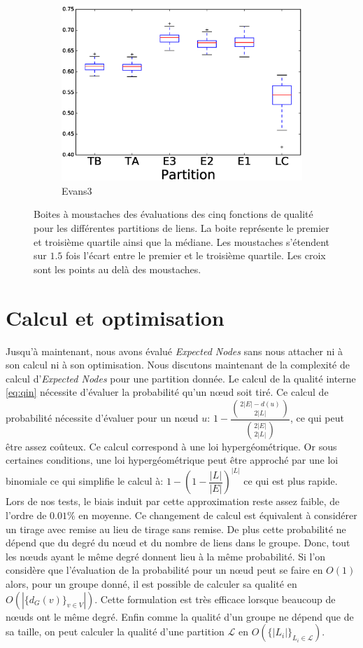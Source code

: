 \begin{figure}
\begin{subfigure}{0.31\textwidth}
		\includegraphics[width=\linewidth]{img/ExpectedNodes/LF/LFR1_Evans3_ALL.eps}
		\caption{\label{fig:LFE3}Evans3}		
	\end{subfigure}
	\caption{Boites à moustaches des évaluations des cinq fonctions de qualité pour les différentes partitions de liens. 
	La boite représente le premier et troisième quartile ainsi que la médiane.
	Les moustaches s'étendent sur $1.5$ fois l'écart entre le premier et le troisième quartile. 
	Les croix sont les points au delà des moustaches.
	}
	\label{fig:LF}
\end{figure}


\section{Calcul et optimisation}
Jusqu'à maintenant, nous avons évalué \emph{Expected Nodes} sans nous attacher ni à son calcul ni à son optimisation.
Nous discutons maintenant de la complexité de calcul d'\emph{Expected Nodes} pour une partition donnée.
Le calcul de la qualité interne \ref{eq:qin} nécessite d'évaluer la probabilité qu'un n\oe{}ud soit tiré.
Ce calcul de probabilité nécessite d'évaluer pour un n\oe{}ud $u$: $1 - \dfrac{ \binom{2|E|-d(u)}{2|L|} }{ \binom{2|E|}{2|L|} }$, ce qui peut être assez coûteux.
Ce calcul correspond à une loi hypergéométrique.
Or sous certaines conditions, une loi hypergéométrique peut être approché par une loi binomiale ce qui simplifie le calcul à: $1 - (1- \dfrac{|L|}{|E|})^{|L|}$ ce qui est plus rapide.
Lors de nos tests, le biais induit par cette approximation reste assez faible, de l'ordre de $0.01\%$ en moyenne.
Ce changement de calcul est équivalent à considérer un tirage avec remise au lieu de tirage sans remise.
De plus cette probabilité ne dépend que du degré du n\oe{}ud et du nombre de liens dans le groupe.
Donc, tout les n\oe{}uds ayant le même degré donnent lieu à la même probabilité.
Si l'on considère que l'évaluation de la probabilité pour un n\oe{}ud peut se faire en $O(1)$ alors, pour un groupe donné, il est possible de calculer sa qualité en $O(|\{d_G(v)\}_{v \in V}|)$.
Cette formulation est très efficace lorsque beaucoup de n\oe{}uds ont le même degré.
Enfin comme la qualité d'un groupe ne dépend que de sa taille, on peut calculer la qualité d'une partition $\mathcal{L}$ en $O(\{|L_i|\}_{L_i \in \mathcal{L}})$.

